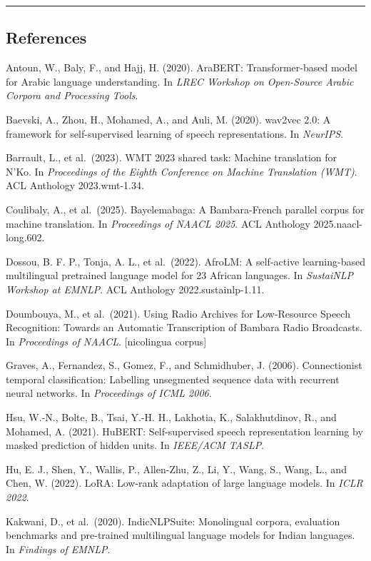 \documentclass[
]{article}
\begin{document}
\begin{center}\rule{0.5\linewidth}{0.5pt}\end{center}

\subsection{References}\label{references}

Antoun, W., Baly, F., and Hajj, H. (2020). AraBERT: Transformer-based
model for Arabic language understanding. In \emph{LREC Workshop on
Open-Source Arabic Corpora and Processing Tools}.

Baevski, A., Zhou, H., Mohamed, A., and Auli, M. (2020). wav2vec 2.0: A
framework for self-supervised learning of speech representations. In
\emph{NeurIPS}.

Barrault, L., et al.~(2023). WMT 2023 shared task: Machine translation
for N'Ko. In \emph{Proceedings of the Eighth Conference on Machine
Translation (WMT)}. ACL Anthology 2023.wmt-1.34.

Coulibaly, A., et al.~(2025). Bayelemabaga: A Bambara-French parallel
corpus for machine translation. In \emph{Proceedings of NAACL 2025}. ACL
Anthology 2025.naacl-long.602.

Dossou, B. F. P., Tonja, A. L., et al.~(2022). AfroLM: A self-active
learning-based multilingual pretrained language model for 23 African
languages. In \emph{SustaiNLP Workshop at EMNLP}. ACL Anthology
2022.sustainlp-1.11.

Doumbouya, M., et al.~(2021). Using Radio Archives for Low-Resource
Speech Recognition: Towards an Automatic Transcription of Bambara Radio
Broadcasts. In \emph{Proceedings of NAACL}. {[}nicolingua corpus{]}

Graves, A., Fernandez, S., Gomez, F., and Schmidhuber, J. (2006).
Connectionist temporal classification: Labelling unsegmented sequence
data with recurrent neural networks. In \emph{Proceedings of ICML 2006}.

Hsu, W.-N., Bolte, B., Tsai, Y.-H. H., Lakhotia, K., Salakhutdinov, R.,
and Mohamed, A. (2021). HuBERT: Self-supervised speech representation
learning by masked prediction of hidden units. In \emph{IEEE/ACM TASLP}.

Hu, E. J., Shen, Y., Wallis, P., Allen-Zhu, Z., Li, Y., Wang, S., Wang,
L., and Chen, W. (2022). LoRA: Low-rank adaptation of large language
models. In \emph{ICLR 2022}.

Kakwani, D., et al.~(2020). IndicNLPSuite: Monolingual corpora,
evaluation benchmarks and pre-trained multilingual language models for
Indian languages. In \emph{Findings of EMNLP}.
\end{document}
